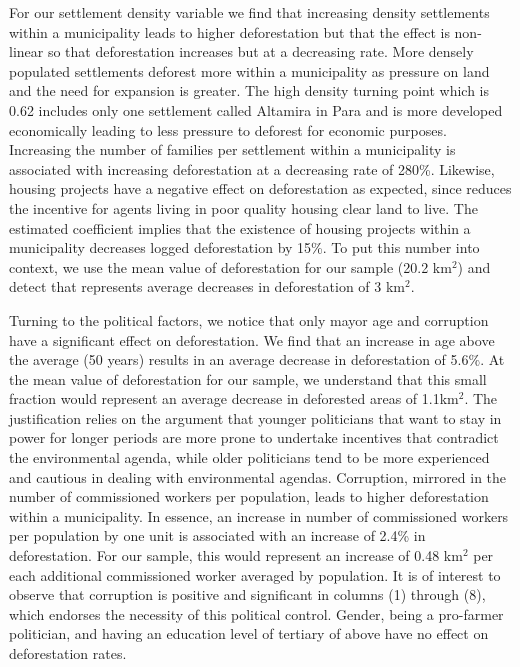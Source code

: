For our settlement density variable we find that increasing density settlements within a municipality leads to higher deforestation but that the effect is non-linear so that deforestation increases but at a decreasing rate. More densely populated settlements deforest more within a municipality as pressure on land and the need for expansion is greater. The high density turning point which is 0.62 includes only one settlement called Altamira in Para and is more developed economically leading to less pressure to deforest for economic purposes. Increasing the number of families per settlement within a municipality is associated with increasing deforestation at a decreasing rate of 280\%. Likewise, housing projects have a negative effect on deforestation as expected, since reduces the incentive for agents living in poor quality housing clear land to live. The estimated coefficient implies that the existence of housing projects within a municipality decreases logged deforestation by 15\%. To put this number into context, we use the mean value of deforestation for our sample (20.2 km$^{2}$) and detect that represents average decreases in deforestation of 3 km$^{2}$.

Turning to the political factors, we notice that only mayor age and corruption have a significant effect on deforestation. We find that an increase in age above the average (50 years) results in an average decrease in deforestation of 5.6$\%$. At the mean value of deforestation for our sample, we understand that this small fraction would represent an average decrease in deforested areas of 1.1km$^{2}$. The justification relies on the argument that younger politicians that want to stay in power for longer periods are more prone to undertake incentives that contradict the environmental agenda, while older politicians tend to be more experienced and cautious in dealing with environmental agendas. Corruption, mirrored in the number of commissioned workers per population, leads to higher deforestation within a municipality. In essence, an increase in number of commissioned workers per population by one unit  is associated with an increase of 2.4\% in deforestation. For our sample, this would represent an increase of 0.48 km$^{2}$ per each additional commissioned worker averaged by population. It is of interest to observe that corruption is positive and significant in columns (1) through (8), which endorses the necessity of this political control. Gender, being a pro-farmer politician, and having an education level of tertiary of above have no effect on deforestation rates.

